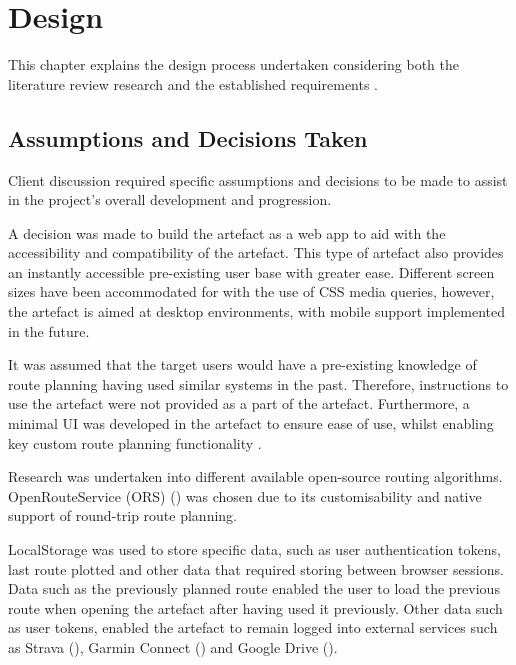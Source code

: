 \chapter{Design}
\label{chap:design}

This chapter explains the design process undertaken considering both the literature review research  and the established requirements .
\section{Assumptions and Decisions Taken}
\label{design:assumptions/decisions}

Client discussion required specific assumptions and decisions to be made to assist in the project's overall development and progression.

A decision was made to build the artefact as a web app to aid with the accessibility and compatibility of the artefact. This type of artefact also provides an instantly accessible pre-existing user base with greater ease. Different screen sizes have been accommodated for with the use of CSS media queries, however, the artefact is aimed at desktop environments, with mobile support implemented in the future. 

It was assumed that the target users would have a pre-existing knowledge of route planning having used similar systems in the past. Therefore, instructions to use the artefact were not provided as a part of the artefact. Furthermore, a minimal UI was developed in the artefact to ensure ease of use, whilst enabling key custom route planning functionality .

Research was undertaken into different available open-source routing algorithms. OpenRouteService (ORS) (\cite{noauthor_openrouteservice_nodate}) was chosen due to its customisability and native support of round-trip route planning.

LocalStorage was used to store specific data, such as user authentication tokens, last route plotted and other data that required storing between browser sessions. Data such as the previously planned route enabled the user to load the previous route when opening the artefact after having used it previously. Other data such as user tokens, enabled the artefact to remain logged into external services such as Strava (\cite{noauthor_strava_nodate}), Garmin Connect (\cite{international_garmin_nodate}) and Google Drive (\cite{noauthor_home_nodate}).

